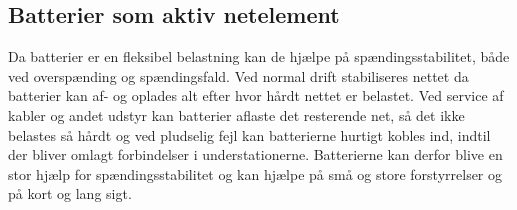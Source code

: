 \subsection{Batterier som aktiv netelement}

Da batterier er en fleksibel belastning kan de hjælpe på spændingsstabilitet, både ved overspænding og spændingsfald. Ved normal drift stabiliseres nettet da batterier kan af- og oplades alt efter hvor hårdt nettet er belastet. Ved service af kabler og andet udstyr kan batterier aflaste det resterende net, så det ikke belastes så hårdt og ved pludselig fejl kan batterierne hurtigt kobles ind, indtil der bliver omlagt forbindelser i understationerne. Batterierne kan derfor blive en stor hjælp for spændingsstabilitet og kan hjælpe på små og store forstyrrelser og på kort og lang sigt.
